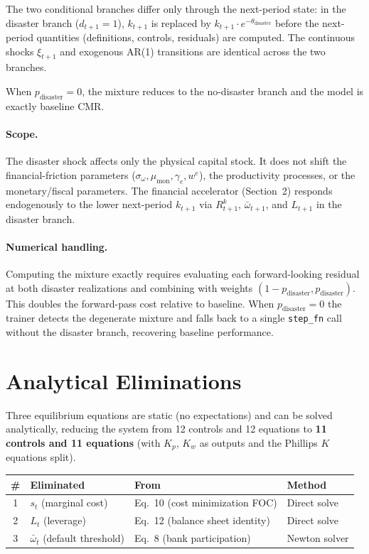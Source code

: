 \documentclass[11pt]{article}
\begin{document}
The two conditional branches differ only through the next-period
state: in the disaster branch ($d_{t+1} = 1$), $k_{t+1}$ is replaced by
$k_{t+1} \cdot e^{-\theta_{\text{disaster}}}$ before the next-period
quantities (definitions, controls, residuals) are computed. The
continuous shocks $\xi_{t+1}$ and exogenous AR(1) transitions are
identical across the two branches.

When $p_{\text{disaster}} = 0$, the mixture reduces to the no-disaster
branch and the model is exactly baseline CMR.

\paragraph{Scope.}
The disaster shock affects only the physical capital stock. It does not
shift the financial-friction parameters ($\sigma_\omega, \mu_{\text{mon}},
\gamma_e, w^e$), the productivity processes, or the monetary/fiscal
parameters. The financial accelerator (Section~2) responds endogenously
to the lower next-period $k_{t+1}$ via $R^k_{t+1}$, $\bar\omega_{t+1}$,
and $L_{t+1}$ in the disaster branch.

\paragraph{Numerical handling.}
Computing the mixture exactly requires evaluating each forward-looking
residual at both disaster realizations and combining with weights
$(1 - p_{\text{disaster}}, p_{\text{disaster}})$. This doubles the
forward-pass cost relative to baseline. When $p_{\text{disaster}} = 0$
the trainer detects the degenerate mixture and falls back to a single
\texttt{step\_fn} call without the disaster branch, recovering baseline
performance.


\section{Analytical Eliminations}
\label{sec:eliminations}

Three equilibrium equations are static (no expectations) and can be solved
analytically, reducing the system from 12 controls and 12 equations to
\textbf{11 controls and 11 equations} (with $K_p$, $K_w$ as outputs and
the Phillips $K$ equations split).

\begin{center}
\begin{tabular}{clll}
\toprule
\# & Eliminated & From & Method \\
\midrule
1 & $s_t$ (marginal cost) & Eq.~10 (cost minimization FOC) & Direct solve \\
2 & $L_t$ (leverage) & Eq.~12 (balance sheet identity) & Direct solve \\
3 & $\bar\omega_t$ (default threshold) & Eq.~8 (bank participation) & Newton solver \\
\bottomrule
\end{tabular}
\end{center}
\end{document}
